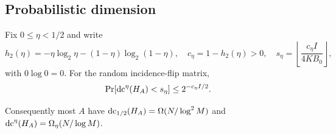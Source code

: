 \subsection{Probabilistic dimension}

\begin{theorem}\label{thm:prob}
Fix $0\le\eta<1/2$ and write
\[
 h_2(\eta)=-\eta\log_2\eta-(1-\eta)\log_2(1-\eta),\quad
 c_\eta=1-h_2(\eta)>0,
 \quad s_\eta=\left\lfloor\frac{c_\eta I}{4KB_0}\right\rfloor,
\]
with $0\log 0=0$. For the random incidence-flip matrix,
\begin{equation}\label{eq:approx-prob}
 \Pr[\operatorname{dc}^\eta(H_A)<s_\eta]\le2^{-c_\eta I/2}.
\end{equation}

Consequently most $A$ have $\operatorname{dc}_{1/2}(H_A)=\Omega(N/\log^2M)$ and $\operatorname{dc}^\eta(H_A)=\Omega_\eta(N/\log M)$.
\end{theorem}

